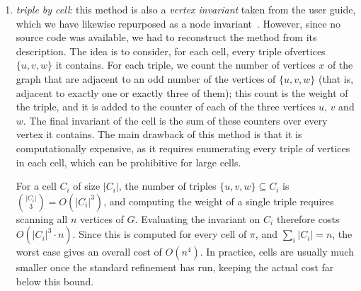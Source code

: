 \begin{enumerate}
\item\textit{triple by cell}: this method is also a \textit{vertex invariant} taken from the \Naut{} user guide, which we have likewise repurposed as a node invariant~\cite{mckay2024nug}. However, since no source code was available, we had to reconstruct the method from its description. The idea is to consider, for each cell, every triple ofvertices $\{u,v,w\}$ it contains. For each triple, we count the number of vertices $x$ of the graph that are adjacent to an odd number of the vertices of $\{u,v,w\}$ (that is, adjacent to exactly one or exactly three of them); this count is the weight of the triple, and it is added
to the counter of each of the three vertices $u$, $v$ and $w$. The final invariant of the cell
is the sum of these counters over every vertex it contains. The main drawback of this method
is that it is computationally expensive, as it requires enumerating every triple of vertices
in each cell, which can be prohibitive for large cells.

\vspace{0.5em}
\noindent{}

For a cell $C_i$ of size $|C_i|$, the number of triples $\{u,v,w\} \subseteq C_i$ is $\binom{|C_i|}{3} = O(|C_i|^3)$, and computing the weight of a single triple requires
scanning all $n$ vertices of $G$. Evaluating the invariant on $C_i$ therefore costs
$O(|C_i|^3 \cdot n)$. Since this is computed for every cell of $\pi$, and $\sum_i |C_i| = n$, the worst case gives an overall cost of $O(n^4)$. In practice, cells are usually much smaller once the standard refinement has run, keeping the actual cost far below this bound.
\end{enumerate}



